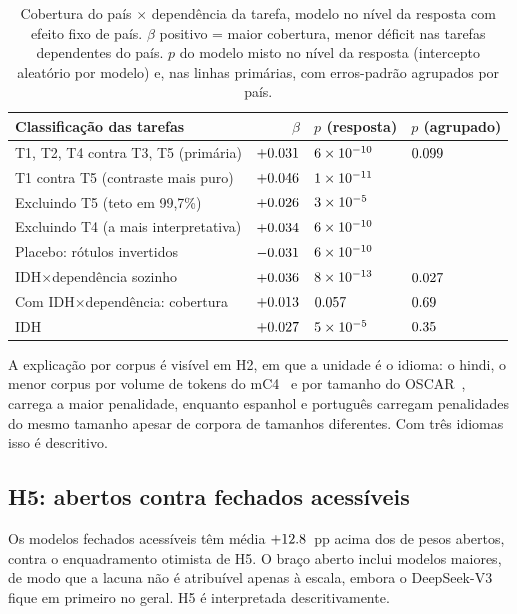 \begin{table}[h]
\centering
\caption{Cobertura do país $\times$ dependência da tarefa, modelo no nível da
resposta com efeito fixo de país. $\beta$ positivo = maior cobertura, menor
déficit nas tarefas dependentes do país. $p$ do modelo misto no nível da
resposta (intercepto aleatório por modelo) e, nas linhas primárias, com
erros-padrão agrupados por país.}
\label{tab:h4-dentro}
\footnotesize
\setlength{\tabcolsep}{8pt}
\renewcommand{\arraystretch}{1.15}
\begin{tabular}{lrll}
\toprule
Classificação das tarefas & $\beta$ & $p$ (resposta) & $p$ (agrupado) \\
\midrule
T1, T2, T4 contra T3, T5 (primária) & $+0.031$ & $6\times10^{-10}$ & $0.099$ \\
T1 contra T5 (contraste mais puro)  & $+0.046$ & $1\times10^{-11}$ & \\
Excluindo T5 (teto em 99,7\%)       & $+0.026$ & $3\times10^{-5}$ & \\
Excluindo T4 (a mais interpretativa) & $+0.034$ & $6\times10^{-10}$ & \\
Placebo: rótulos invertidos         & $-0.031$ & $6\times10^{-10}$ & \\
IDH$\times$dependência sozinho      & $+0.036$ & $8\times10^{-13}$ & $0.027$ \\
Com IDH$\times$dependência: cobertura & $+0.013$ & $0.057$ & $0.69$ \\
\quad IDH                           & $+0.027$ & $5\times10^{-5}$ & $0.35$ \\
\bottomrule
\end{tabular}
\end{table}

A explicação por corpus é visível em H2, em que a unidade é o idioma: o hindi,
o menor corpus por volume de tokens do mC4~\citep{xue2021mt5} e por tamanho do
OSCAR~\citep{abadji2022oscar}, carrega a maior penalidade, enquanto espanhol e
português carregam penalidades do mesmo tamanho apesar de corpora de tamanhos
diferentes. Com três idiomas isso é descritivo.

\subsection{H5: abertos contra fechados acessíveis}
\label{sec:res:h5}

Os modelos fechados acessíveis têm média $+12.8$~pp acima dos de pesos
abertos, contra o enquadramento otimista de H5. O braço aberto inclui modelos
maiores, de modo que a lacuna não é atribuível apenas à escala, embora o
DeepSeek-V3 fique em primeiro no geral. H5 é interpretada descritivamente.

